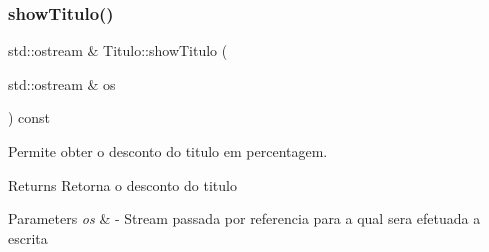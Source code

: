 \subsubsection{\texorpdfstring{show\+Titulo()}{showTitulo()}}
{\footnotesize\ttfamily std\+::ostream \& Titulo\+::show\+Titulo (\begin{DoxyParamCaption}\item[{std\+::ostream \&}]{os }\end{DoxyParamCaption}) const}



Permite obter o desconto do titulo em percentagem. 

\begin{DoxyReturn}{Returns}
Retorna o desconto do titulo 
\end{DoxyReturn}

\begin{DoxyParams}{Parameters}
{\em os} & -\/ Stream passada por referencia para a qual sera efetuada a escrita \\
\hline
\end{DoxyParams}

